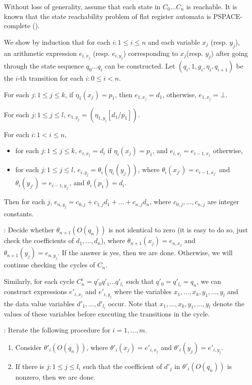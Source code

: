 \documentclass[runningheads,a4paper]{llncs}
\def\Ss{{\mathcal{S} }}
\begin{document}
Without loss of generality, assume that each state in $C_0 \dots C_n$ is reachable. It is known that the state reachability problem of flat register automata is PSPACE-complete (\cite{DL09}). 


We show by induction that for each $i: 1 \le i \le n$ and each variable $x_j$ (resp. $y_j$), an arithmetic expression $e_{i,x_j}$ (resp. $e_{i,y_j}$) corresponding to $x_j$(resp. $y_j$) after going through the state sequence $q_0 \dots q_i$ can be constructed. Let $(q_{i}, 1, g_{i}, \eta_{i}, q_{i+1})$ be the $i$-th transition for each $i: 0 \le i < n$.

For each $j: 1 \le j \le k$, if $\eta_1(x_j)=p_1$, then $e_{1,x_j}=d_1$, otherwise, $e_{1,x_j}=\bot$.

For each $j: 1 \le j \le l$, $e_{1,y_j} = (\eta_{1,y_j}[d_1/p_1])$. 

For each $i: 1 < i \le n$, 
\begin{itemize}
\item for each $j: 1 \le j \le k$, $e_{i,x_j}=d_i$ if $\eta_i(x_j)=p_1$, and $e_{i,x_j}=e_{i-1,x_j}$ otherwise,
%
\item for each $j: 1 \le j \le l$, $e_{i,y_j} = \theta_i(\eta_i(y_j))$, where $\theta_i(x_{j'})=e_{i-1,x_{j'}}$ and $\theta_i(y_{j'})=e_{i-1, y_{j'}}$, and $\theta_i(p_1)=d_i$.
\end{itemize}

Then for each $j$, $e_{n,y_j} = c_{0,j} + c_{1,j} d_1 + \dots + c_{n,j} d_n$, where $c_{0,j},\dots, c_{n,j}$ are integer constants.

\smallskip

: Decide whether $\theta_{n+1}(O(q_n))$ is not identical to zero (it is easy to do so, just check the coefficients of $d_1,\dots,d_n$), where $\theta_{n+1}(x_j)=e_{n,x_j}$ and $\theta_{n+1}(y_j)=e_{n,y_j}$. If the answer is yes, then we are done. Otherwise, we will continue checking the cycles of $C_n$.

Similarly, for each cycle $C^i_n = q'_0 q'_1 \dots q'_{l_i}$ such that $q'_0 = q'_{l_i}=q_n$, we can construct expressions $e'_{i,x_j}$ and $e'_{i,y_j}$ where the variables $x_1,\dots,x_k,y_1,\dots,y_l$ and the data value variables $d'_1,\dots,d'_{l_i}$ occur. Note that $x_1,\dots,x_k,y_1,\dots,y_l$ denote the values of these variables before executing the transitions in the cycle.

\smallskip

: Iterate the following procedure for $i = 1, \dots, m$.
\begin{enumerate}
\item Consider $\theta'_i(O(q_n))$, where $\theta'_i(x_j)=e'_{i,x_j}$ and $\theta'_i(y_j)=e'_{i,y_j}$. 
%
\item If there is $j: 1 \le j \le l_i$ such that the coefficient of $d'_j$ in $\theta'_i(O(q_n))$ is nonzero, then we are done. 
\end{enumerate}
\end{document}

